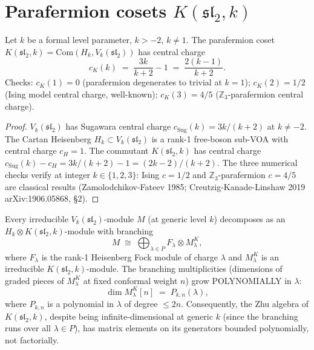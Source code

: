 \section{Parafermion cosets $K(\mathfrak{sl}_2, k)$}
\label{sec:parafermion-cosets}

\begin{proposition}
\label{prop:parafermion-central-charge-closed-form}
\ClaimStatusProvedHere
Let $k$ be a formal level parameter, $k > -2$, $k \neq 1$. The
parafermion coset $K(\mathfrak{sl}_2, k) =
\mathrm{Com}(H_k, V_k(\mathfrak{sl}_2))$ has central charge
\[
 c_K(k)
 \;=\;
 \frac{3 k}{k + 2} - 1
 \;=\;
 \frac{2(k - 1)}{k + 2}.
\]
Checks: $c_K(1) = 0$ (parafermion degenerates to trivial at $k = 1$);
$c_K(2) = 1/2$ (Ising model central charge, well-known);
$c_K(3) = 4/5$ ($\mathbb{Z}_3$-parafermion central charge).
\end{proposition}

\begin{proof}
$V_k(\mathfrak{sl}_2)$ has Sugawara central charge
$c_{\mathrm{Sug}}(k) = 3 k / (k + 2)$ at $k \neq -2$. The Cartan
Heisenberg $H_k \subset V_k(\mathfrak{sl}_2)$ is a rank-1 free-boson
sub-VOA with central charge $c_H = 1$. The commutant
$K(\mathfrak{sl}_2, k)$ has central charge
$c_{\mathrm{Sug}}(k) - c_H = 3k/(k+2) - 1 = (2k - 2)/(k + 2)$. The
three numerical checks verify at integer $k \in \{1, 2, 3\}$: Ising
$c = 1/2$ and $\mathbb{Z}_3$-parafermion $c = 4/5$ are classical
results
(Zamolodchikov-Fateev 1985; Creutzig-Kanade-Linshaw 2019
arXiv:1906.05868, \S 2).
\end{proof}

\begin{proposition}
\label{prop:heisenberg-branching-polynomial}
\ClaimStatusProvedHere
Every irreducible $V_k(\mathfrak{sl}_2)$-module $M$ (at generic level
$k$) decomposes as an $H_k \otimes K(\mathfrak{sl}_2, k)$-module with
branching
\[
 M
 \;\cong\;
 \bigoplus_{\lambda \in P} F_\lambda \otimes M_\lambda^K,
\]
where $F_\lambda$ is the rank-1 Heisenberg Fock module of charge
$\lambda$ and $M_\lambda^K$ is an irreducible
$K(\mathfrak{sl}_2, k)$-module. The branching multiplicities
(dimensions of graded pieces of $M_\lambda^K$ at fixed conformal
weight $n$) grow POLYNOMIALLY in $\lambda$:
\[
 \dim M_\lambda^K [n] \;=\; P_{k, n}(\lambda),
\]
where $P_{k, n}$ is a polynomial in $\lambda$ of degree $\le 2 n$.
Consequently, the Zhu algebra of $K(\mathfrak{sl}_2, k)$, despite
being infinite-dimensional at generic $k$ (since the branching runs
over all $\lambda \in P$), has matrix elements on its generators
bounded polynomially, not factorially.
\end{proposition}

